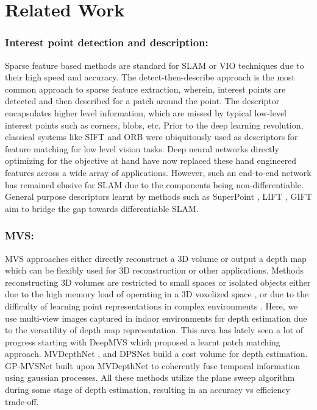\documentclass[runningheads]{llncs}
\begin{document}
\section{Related Work}

\subsubsection{Interest point detection and description:} Sparse feature based methods are standard for SLAM or VIO techniques due to their high speed and accuracy. The detect-then-describe approach is the most common approach to sparse feature extraction, wherein, interest points are detected and then described for a patch around the point. The descriptor encapsulates higher level information, which are missed by typical low-level interest points such as corners, blobs, etc. Prior to the deep learning revolution, classical systems like SIFT \cite{lowe2004distinctive} and ORB \cite{rublee2011orb} were ubiquitously used as descriptors for feature matching for low level vision tasks. Deep neural networks directly optimizing for the objective at hand have now replaced these hand engineered features across a wide array of applications. However, such an end-to-end network has remained elusive for SLAM \cite{murthy2019gradslam} due to the components being non-differentiable. General purpose descriptors learnt by methods such as SuperPoint \cite{superpoint}, LIFT \cite{yi2016lift}, GIFT \cite{liu2019gift} aim to bridge the gap towards differentiable SLAM. 








\subsubsection{MVS:} MVS approaches either directly reconstruct a 3D volume or output a depth map which can be flexibly used for 3D reconstruction or other applications. Methods reconstructing 3D volumes \cite{yao2018mvsnet,chen2019point} are restricted to small spaces or isolated objects either due to the high memory load of operating in a 3D voxelized space \cite{riegler2017octnet,sinha2017surfnet}, or due to the difficulty of learning point representations in complex environments \cite{qi2017pointnet}. Here, we use multi-view images captured in indoor environments for depth estimation due to the versatility of depth map representation. This area has lately seen a lot of progress starting with DeepMVS \cite{huang2018deepmvs} which proposed a learnt patch matching approach. MVDepthNet \cite{wang2018mvdepthnet}, and DPSNet \cite{im2019dpsnet} build a cost volume for depth estimation. GP-MVSNet \cite{hou2019multi} built upon MVDepthNet to coherently fuse temporal information using gaussian processes. All these methods utilize the plane sweep algorithm during some stage of depth estimation, resulting in an accuracy vs efficiency trade-off. 
\end{document}
